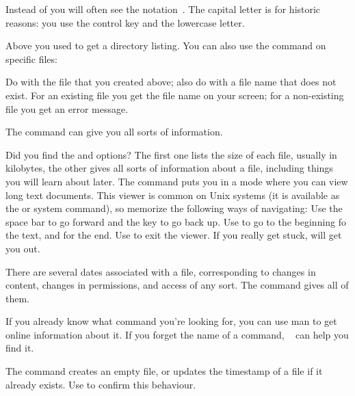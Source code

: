   \begin{remark}
  Instead of  you will often see the notation~. 
  The capital letter is for historic reasons: you use the control key
  and the lowercase letter.
  \end{remark}

Above you used  to get a directory listing. You can also use the
 command on specific files: 

\practical
{Do  with the file that you created above; also do
   with a file name that does not exist.}
{For an existing file you get the file name on your screen; for a
  non-existing file you get an error message.}
{}

The  command can give you all sorts of information.

{Did you find the  and 
  options? The first one lists the size of each file, usually in
  kilobytes, the other gives all sorts of information about a file,
  including things you will learn about later.}  
{The  command
  puts you in a mode where you can view long text documents. This
  viewer is common on Unix systems (it is available as the  or
   system command), so memorize the following ways of navigating: Use
  the space bar to go forward and the  key to go back up. Use
   to go to the beginning fo the text, and  for the end. Use
   to exit the viewer. If you really get stuck,  will
  get you out.}

\begin{remark}
  There are several dates associated with a file, corresponding to
  changes in content, changes in permissions, and access of any
  sort. The  command gives all of them.
\end{remark}
\begin{remark}
  If you already know what command you're looking for, you can use man
  to get online information about it. If you forget the name of a
  command, ~ can help you find it.
\end{remark}

The  command creates an empty file, or updates the timestamp of
a file if it already exists. Use  to confirm this behaviour.

